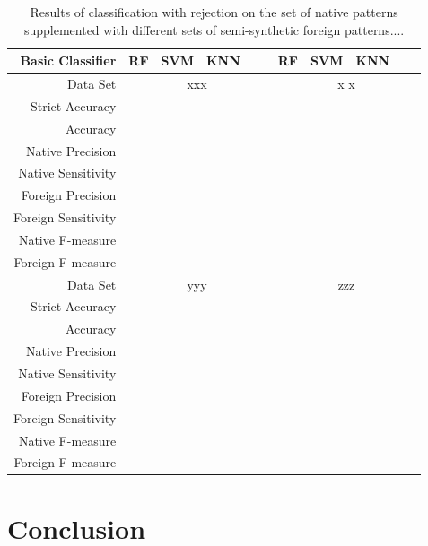 \documentclass{llncs}
\begin{document}
\begin{table}[!htb]
\centering
\caption{Results of classification with rejection on the set of native patterns supplemented with different sets of semi-synthetic  foreign patterns....}
\vspace{3pt}
\setlength{\tabcolsep}{4pt}
\renewcommand{\arraystretch}{1}
\begin{tabular}{||r||ccccc||ccccc||}
\hline
  Basic Classifier & RF & SVM & KNN &  &  &  RF & SVM & KNN &  &  \\
\hline
  Data Set & \multicolumn{5}{c||}{ xxx } & \multicolumn{5}{c|}{ x x } \\
\hline
\hline
Strict Accuracy     &&&&&&&&&& \\
Accuracy            &&&&&&&&&& \\
Native Precision    &&&&&&&&&&  \\
Native Sensitivity  &&&&&&&&&&  \\
Foreign Precision   &&&&&&&&&&  \\
Foreign Sensitivity &&&&&&&&&&  \\
Native F-measure    &&&&&&&&&& \\
Foreign F-measure   &&&&&&&&&&  \\
\hline
\hline
  Data Set & \multicolumn{5}{c||}{ yyy } & \multicolumn{5}{c|}{ zzz } \\
\hline
\hline
Strict Accuracy     &&&&&&&&&&  \\
Accuracy            &&&&&&&&&& \\
Native Precision    &&&&&&&&&&  \\
Native Sensitivity  &&&&&&&&&&  \\
Foreign Precision   &&&&&&&&&&  \\
Foreign Sensitivity &&&&&&&&&& \\
Native F-measure    &&&&&&&&&&  \\
Foreign F-measure   &&&&&&&&&&  \\
   \hline
\end{tabular}
\vspace{12pt}
\label{tab:rejection_results}
\end{table}


\section{Conclusion}
  \label{Conclusion}
\end{document}
